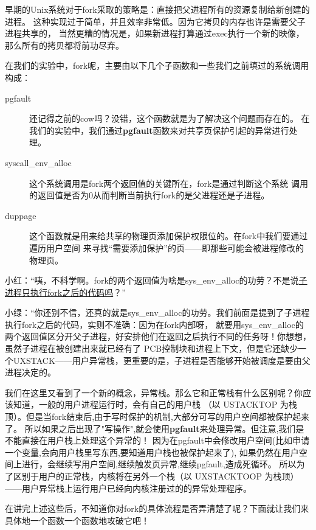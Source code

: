 \begin{note}
早期的Unix系统对于fork采取的策略是：直接把父进程所有的资源复制给新创建的进程。
这种实现过于简单，并且效率非常低。因为它拷贝的内存也许是需要父子进程共享的，
当然更糟的情况是，如果新进程打算通过exec执行一个新的映像，那么所有的拷贝都将前功尽弃。
\end{note}

在我们的实验中，fork呢，主要由以下几个子函数和一些我们之前填过的系统调用构成：
\begin{description}
 \item [pgfault] 还记得之前的cow吗？没错，这个函数就是为了解决这个问题而存在的。
 在我们的实验中，我们通过\textbf{pgfault}函数来对共享页保护引起的异常进行处理。
 \item [syscall\_env\_alloc] 这个系统调用是fork两个返回值的关键所在，fork是通过判断这个系统
 调用的返回值是否为0从而判断当前执行fork的是父进程还是子进程。
 \item [duppage] 这个函数就是用来给共享的物理页添加保护权限位的。在fork中我们要通过遍历用户空间
 来寻找“需要添加保护”的页——即那些可能会被进程修改的物理页。
\end{description}

\label{fork区分父子进程}
小红：“咦，不科学啊。fork的两个返回值为啥是sys\_env\_alloc的功劳？不是说\hyperref[fork与子进程]{子进程只执行fork之后的代码吗}？”

小绿：“你还别不信，还真的就是sys\_env\_alloc的功劳。我们前面是提到了子进程执行fork之后的代码，实则不准确：因为在fork内部呀，
就要用sys\_env\_alloc的两个返回值区分开父子进程，好安排他们在返回之后执行不同的任务呀！你想想，虽然子进程在被创建出来就已经有了
PCB控制块和进程上下文，但是它还缺少一个UXSTACK——用户异常栈，更重要的是，子进程是否能够开始被调度是要由父进程决定的。

我们在这里又看到了一个新的概念，异常栈。那么它和正常栈有什么区别呢？你应该知道，一般的用户进程运行时，会有自己的用户栈
（以 USTACKTOP 为栈顶）。但是当fork结束后,由于写时保护的机制,大部分可写的用户空间都被保护起来了。
所以如果之后出现了"写操作",就会使用\textbf{pgfault}来处理异常。但注意,我们是不能直接在用户栈上处理这个异常的！
因为在pgfault中会修改用户空间(比如申请一个变量,会向用户栈里写东西,要知道用户栈也被保护起来了),
如果仍然在用户空间上进行，会继续写用户空间,继续触发页异常,继续pgfault,造成死循环。
所以为了区别于用户的正常栈，内核将在另外一个栈（以 UXSTACKTOOP 为栈顶）——用户异常栈上运行用户已经向内核注册过的的异常处理程序。

在讲完上述这些后，不知道你对fork的具体流程是否弄清楚了呢？下面就让我们来具体地一个函数一个函数地攻破它吧！

